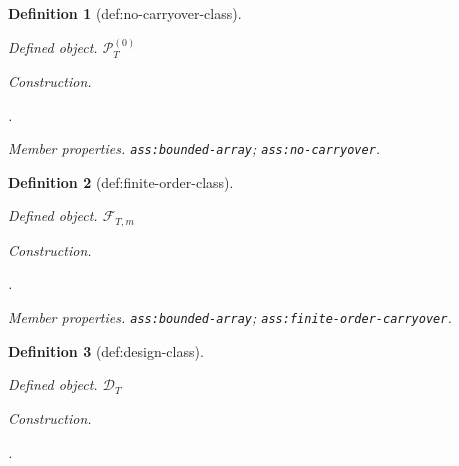 \documentclass{article}
\newtheorem{definition}{Definition}
\begin{document}
\begin{definition}[def:no-carryover-class]\label{def:no-carryover-class}
\par\smallskip\noindent\emph{Defined object.} \(\mathcal P_T^{(0)}\)
\par\smallskip\noindent\emph{Construction.} \leavevmode\par\noindent {}\par\noindent.
\par\smallskip\noindent\emph{Member properties.} \texttt{ass:\allowbreak{}bounded-\allowbreak{}array}; \texttt{ass:\allowbreak{}no-\allowbreak{}carryover}.
\end{definition}

\begin{definition}[def:finite-order-class]\label{def:finite-order-class}
\par\smallskip\noindent\emph{Defined object.} \(\mathcal F_{T,m}\)
\par\smallskip\noindent\emph{Construction.} \leavevmode\par\noindent {}\par\noindent.
\par\smallskip\noindent\emph{Member properties.} \texttt{ass:\allowbreak{}bounded-\allowbreak{}array}; \texttt{ass:\allowbreak{}finite-\allowbreak{}order-\allowbreak{}carryover}.
\end{definition}

\begin{definition}[def:design-class]\label{def:design-class}
\par\smallskip\noindent\emph{Defined object.} \(\mathcal D_T\)
\par\smallskip\noindent\emph{Construction.} \leavevmode\par\noindent {}\par\noindent.
\end{definition}
\end{document}
